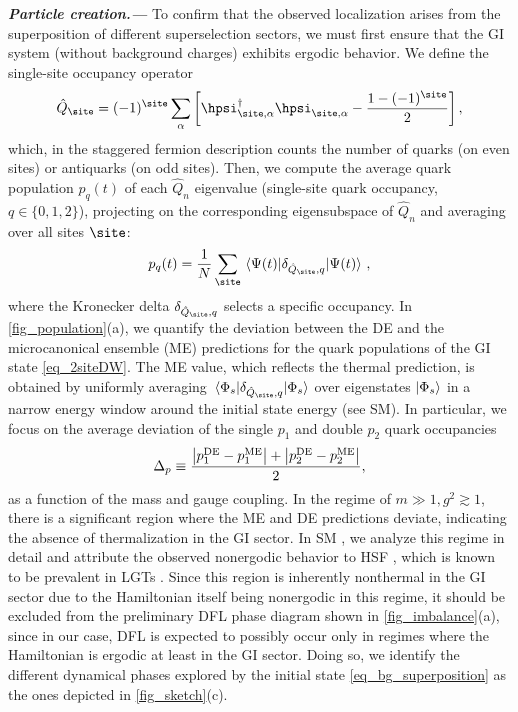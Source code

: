 \documentclass[aps,prl,reprint,twocolumn,superscriptaddress,floatfix,nofootinbib]{revtex4-2}
\begin{document}
\textbf{\textit{Particle creation.---}}
To confirm that the observed localization arises from the superposition of different superselection sectors, we must first ensure that the GI system (without background charges) exhibits ergodic behavior.
We define the single-site occupancy operator
\begin{equation}
    \hat{Q}_{\site} = (-1)^{\site}\sum_{\alpha}
    \qty[\hpsi^{\dagger}_{\site,\alpha}\hpsi_{\site,\alpha}-\frac{1-(-1)^{\site}}{2}]\,,
\end{equation}
which, in the staggered fermion description \cite{Susskind1977LatticeFermions, Calajo2024DigitalQuantumSimulation, Calajo2025QuantumManybodyScarring} counts the number of quarks (on even sites) or antiquarks (on odd sites).
Then, we compute the average quark population $p_{q}(t)$ of each $\hat{Q}_n$ eigenvalue (single-site quark occupancy, $q\in\{0,1,2\}$), projecting on the corresponding eigensubspace of $\hat Q_n$ and averaging over all sites $\site$:
\begin{equation}
    \label{eq_population}
    p_{q}(t) = \frac{1}{N} \sum_{\site}\ev{\delta_{\hat{Q}_{\site}, q}}{\Psi(t)}\,,
\end{equation}
where the Kronecker delta $\delta_{\hat{Q}_{\site}, q}$ selects a specific occupancy.
In \cref{fig_population}(a), we quantify the deviation between the DE and the microcanonical ensemble (ME) predictions for the quark populations of the GI state \cref{eq_2siteDW}.
The ME value, which reflects the thermal prediction, is obtained by uniformly averaging $\mel{\Phi_s}{\delta_{\hat{Q}_{\site},q}}{\Phi_s}$ over eigenstates $\ket{\Phi_s}$ in a narrow energy window around the initial state energy (see SM).
In particular, we focus on the average deviation of the single $p_1$ and double $p_2$ quark occupancies
\begin{equation}
    \Delta_{p}\equiv \frac{\abs{p_{1}^\text{DE}-p_{1}^\text{ME}}+\abs{p_{2}^\text{DE}-p_{2}^\text{ME}}}{2},
    \label{eq_delta_p}
\end{equation}
as a function of the mass and gauge coupling.
In the regime of $m\gg 1, g^{2}\gtrsim 1$, there is a significant region where the ME and DE predictions deviate, indicating the absence of thermalization in the GI sector.
In SM \cite{SM}, we analyze this regime in detail and attribute the observed nonergodic behavior to HSF \cite{Sala2020ErgodicityBreakingArising, Moudgalya2022QuantumManybodyScars}, which is known to be prevalent in LGTs \cite{Jeyaretnam2025HilbertSpaceFragmentation, Ciavarella2025GenericHilbertSpace}.
Since this region is inherently nonthermal in the GI sector due to the Hamiltonian itself being nonergodic in this regime, it should be excluded from the preliminary DFL phase diagram shown in \cref{fig_imbalance}(a), since in our case, DFL is expected to possibly occur only in regimes where the Hamiltonian is ergodic at least in the GI sector.
Doing so, we identify the different dynamical phases explored by the initial state \cref{eq_bg_superposition} as the ones depicted in \cref{fig_sketch}(c).
\end{document}
